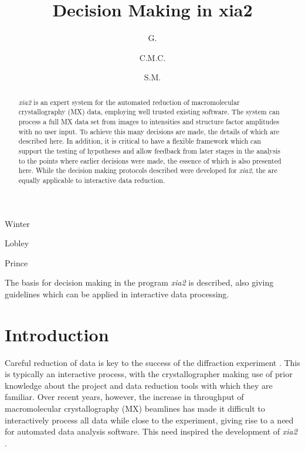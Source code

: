 \documentclass[preprint,pdf]{iucr}
\begin{document}
\title{Decision Making in xia2}

\author[a]{G.}{Winter}
\author[a]{C.M.C.}{Lobley}
\author[b]{S.M.}{Prince}


\maketitle
\clearpage

\begin{synopsis}
The basis for decision making in the program \emph{xia2} is described,
also giving guidelines which can be applied in interactive data processing.
\end{synopsis}

\begin{abstract}

\emph{xia2} is an expert system for the automated reduction of
macromolecular crystallography (MX) data, employing well trusted
existing software. The system can process a full MX data set from
images to intensities and structure factor amplitudes with no user
input. To achieve this many decisions are made, the details of which
are described here. In addition, it is critical to have a
flexible framework which can support the testing of hypotheses and
allow feedback from later stages in the analysis to the points where
earlier decisions were made, the essence of which is also
presented here. While the decision making protocols described were
developed for \emph{xia2}, the are equally applicable to interactive
data reduction.

\end{abstract}

\section{Introduction}

Careful reduction of data is key to the success of the diffraction
experiment \cite{Dauter:ba0020}. This is typically an interactive
process, with the crystallographer making use of prior knowledge about
the project and data reduction tools with which they are
familiar. Over recent years, however, the increase in throughput of
macromolecular crystallography (MX) beamlines has made it difficult to
interactively process all data while close to the experiment, giving
rise to a need for automated data analysis software. This need
inspired the development of \emph{xia2} \cite{Winter:ea5113}. 
\end{document}
